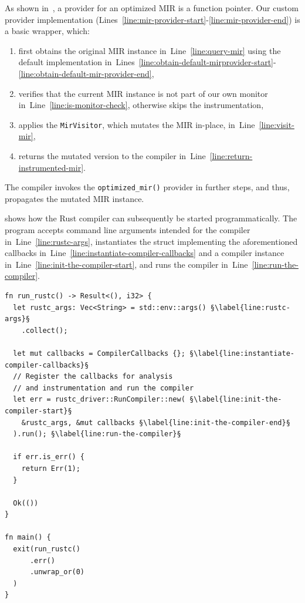 \documentclass[paper=a4,%
  twoside,%
  BCOR4mm,%
  abstract=true,%
  toc=bibliography,%
  chapterprefix=true,%
  toc=bibliographynumbered,%
  open=right,%
  english,%
  pagesize=pdftex]{scrreprt}
\newcommand{\mir}{\ac{MIR}\xspace}
\begin{document}
As shown in~, a provider for an optimized \mir is a function pointer. Our custom provider implementation (Lines~\ref{line:mir-provider-start}-\ref{line:mir-provider-end}) is a basic wrapper, which:
\begin{enumerate}
  \item first obtains the original \mir instance in~Line~\ref{line:query-mir} using the default implementation in~Lines~\ref{line:obtain-default-mirprovider-start}-\ref{line:obtain-default-mir-provider-end},
  \item verifies that the current \mir instance is not part of our own monitor in~Line~\ref{line:is-monitor-check}, otherwise skips the instrumentation,
  \item applies the \texttt{MirVisitor}, which mutates the \mir in-place, in~Line~\ref{line:visit-mir},
  \item returns the mutated version to the compiler in~Line~\ref{line:return-instrumented-mir}.
\end{enumerate}

The compiler invokes the \texttt{optimized\string_mir()} provider in further steps, and thus, propagates the mutated \mir instance.

 shows how the Rust compiler can subsequently be started programmatically. The program accepts command line arguments intended for the compiler in~Line~\ref{line:rustc-args}, instantiates the struct implementing the aforementioned callbacks in~Line~\ref{line:instantiate-compiler-callbacks} and a compiler instance in~Line~\ref{line:init-the-compiler-start}, and runs the compiler in~Line~\ref{line:run-the-compiler}.

\begin{lstlisting}[style=boxed, caption={Running the Rust compiler like a library}, label=lst:running-compiler, escapechar=§]
fn run_rustc() -> Result<(), i32> {
  let rustc_args: Vec<String> = std::env::args() §\label{line:rustc-args}§
    .collect();

  let mut callbacks = CompilerCallbacks {}; §\label{line:instantiate-compiler-callbacks}§
  // Register the callbacks for analysis
  // and instrumentation and run the compiler
  let err = rustc_driver::RunCompiler::new( §\label{line:init-the-compiler-start}§
    &rustc_args, &mut callbacks §\label{line:init-the-compiler-end}§
  ).run(); §\label{line:run-the-compiler}§

  if err.is_err() {
    return Err(1);
  }

  Ok(())
}

fn main() {
  exit(run_rustc()
      .err()
      .unwrap_or(0)
  )
}
\end{lstlisting}
\end{document}

